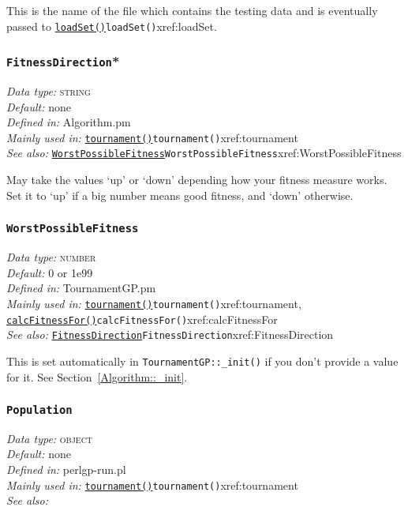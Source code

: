 \documentclass[a4paper]{article}
\begin{document}
This is the name of the file which contains the testing data and is
eventually passed to \hyperref[no]{\texttt{loadSet()}}{\texttt{loadSet()}}{xref:loadSet}.

\subsubsection{\texttt{FitnessDirection}*}\label{xref:FitnessDirection}
\begin{flushleft}
\textit{Data type:} \textsc{string}\\
\textit{Default:} none\\
\textit{Defined in:} Algorithm.pm\\
\textit{Mainly used in:} \hyperref[no]{\texttt{tournament()}}{\texttt{tournament()}}{xref:tournament} \\
\textit{See also:} \hyperref[no]{\texttt{WorstPossibleFitness}}{\texttt{WorstPossibleFitness}}{xref:WorstPossibleFitness}
\end{flushleft}

May take the values `up' or `down' depending how your fitness measure
works.  Set it to `up' if a big number means good fitness, and `down'
otherwise.

\subsubsection{\texttt{WorstPossibleFitness}}\label{xref:WorstPossibleFitness}
\begin{flushleft}
\textit{Data type:} \textsc{number}\\
\textit{Default:} 0 or 1e99\\
\textit{Defined in:} TournamentGP.pm\\
\textit{Mainly used in:} \hyperref[no]{\texttt{tournament()}}{\texttt{tournament()}}{xref:tournament}, \hyperref[no]{\texttt{calcFitnessFor()}}{\texttt{calcFitnessFor()}}{xref:calcFitnessFor}\\
\textit{See also:} \hyperref[no]{\texttt{FitnessDirection}}{\texttt{FitnessDirection}}{xref:FitnessDirection}
\end{flushleft}

This is set automatically in \texttt{TournamentGP::\_init()} if you
don't provide a value for it.  See Section~\ref{Algorithm::_init}.

\subsubsection{\texttt{Population}}\label{xref:Population}
\begin{flushleft}
\textit{Data type:} \textsc{object}\\
\textit{Default:} none\\
\textit{Defined in:} perlgp-run.pl\\
\textit{Mainly used in:} \hyperref[no]{\texttt{tournament()}}{\texttt{tournament()}}{xref:tournament}\\
\textit{See also:}
\end{flushleft}
\end{document}
